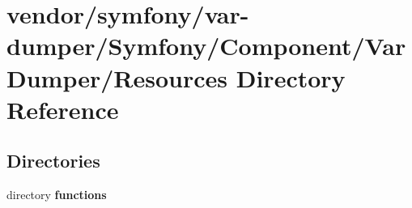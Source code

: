 \section{vendor/symfony/var-\/dumper/\+Symfony/\+Component/\+Var\+Dumper/\+Resources Directory Reference}
\label{dir_e887b91b302b4f9deb4a76ecc5cfb142}
\subsection*{Directories}
\begin{DoxyCompactItemize}
\item 
directory {\bf functions}
\end{DoxyCompactItemize}
